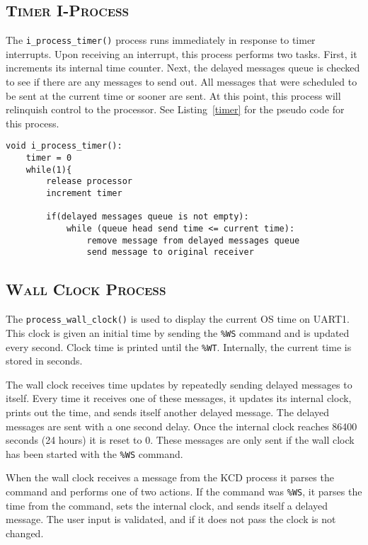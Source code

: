 \documentclass[oneside]{report}
\begin{document}
\subsection{\textsc{Timer I-Process}}
The \texttt{i\_process\_timer()} process runs immediately in response
to timer interrupts. Upon receiving an interrupt, this process
performs two tasks. First, it increments its internal time
counter. Next, the delayed messages queue is checked to see if there
are any messages to send out. All messages that were scheduled to be
sent at the current time or sooner are sent. At this point, this
process will relinquish control to the processor. See
Listing~\ref{timer} for the pseudo code for this process.

\begin{lstlisting}
void i_process_timer():
    timer = 0
    while(1){
        release processor
        increment timer

        if(delayed messages queue is not empty):
            while (queue head send time <= current time):
                remove message from delayed messages queue
                send message to original receiver
\end{lstlisting}

\subsection{\textsc{Wall Clock Process}}
The \texttt{process\_wall\_clock()} is used to display the current OS
time on UART1. This clock is given an initial time by sending the
\texttt{\%WS} command and is updated every second. Clock time is printed
until the \texttt{\%WT}. Internally, the current time is stored in seconds.

The wall clock receives time updates by repeatedly sending delayed
messages to itself. Every time it receives one of these messages, it
updates its internal clock, prints out the time, and sends itself
another delayed message. The delayed messages are sent with a one
second delay. Once the internal clock reaches 86400 seconds (24 hours)
it is reset to 0. These messages are only sent if the wall clock has
been started with the \texttt{\%WS} command.

When the wall clock receives a message from the KCD process it parses
the command and performs one of two actions. If the command was
\texttt{\%WS}, it parses the time from the command, sets the internal
clock, and sends itself a delayed message. The user input is
validated, and if it does not pass the clock is not changed.
\end{document}
